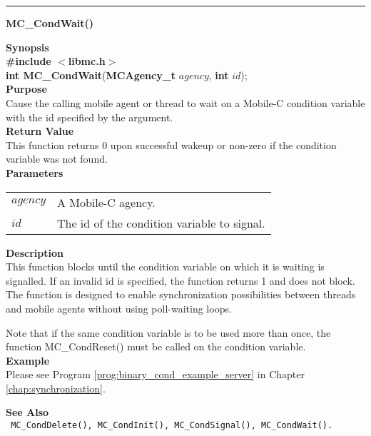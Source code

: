 \noindent
\vspace{5pt}
\rule{6.5in}{0.015in}
\noindent
{}
{\LARGE \bf MC\_CondWait()}\\
\label{api:MC_CondWait()}

\noindent
{\bf Synopsis}\\
{\bf \#include $<$libmc.h$>$}\\
{\bf int MC\_CondWait}({\bf MCAgency\_t} $agency$, {\bf int} $id$);\\

\noindent
{\bf Purpose}\\
Cause the calling mobile agent or thread to wait on a Mobile-C condition 
variable with the id specified by the argument.\\

\noindent
{\bf Return Value}\\
This function returns 0 upon successful wakeup or non-zero if the condition 
variable was not found. \\

\noindent
{\bf Parameters}
\vspace{-0.1pt}
\begin{description}
\item
\begin{tabular}{p{10 mm}p{145 mm}} 
$agency$ & A Mobile-C agency. \\
$id$ & The id of the condition variable to signal. 
\end{tabular}
\end{description}

\noindent
{\bf Description}\\
This function blocks until the condition variable on which it is waiting is 
signalled.
If an invalid id is specified, the function returns 1 and does not block.
The function is designed to enable synchronization possibilities between 
threads and mobile agents without using poll-waiting loops.

Note that if the same condition variable is to be used more than once,
the function MC\_CondReset() must be called on the condition variable.\\

\noindent
{\bf Example}\\
Please see Program \vref{prog:binary_cond_example_server} in Chapter
\ref{chap:synchronization}.\\
\noindent

\noindent
{\bf See Also}\\
\texttt{
MC\_CondDelete(), MC\_CondInit(), MC\_CondSignal(), 
\linebreak MC\_CondWait().
}

